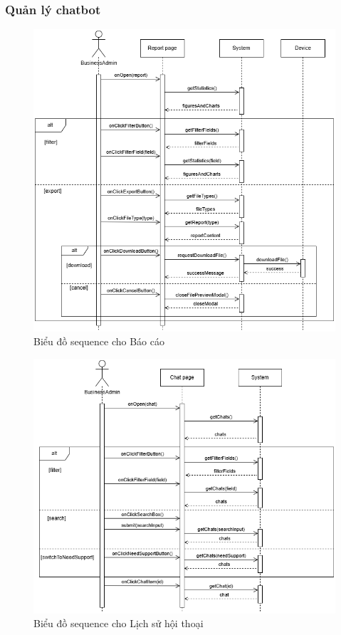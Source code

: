 \subsubsection{Quản lý chatbot}
\begin{figure}[H]
    \centering
     \includegraphics[width=1\textwidth]{Dg_Sequence/Report.png}
    \vspace{0.5cm}
    \caption{Biểu đồ sequence cho Báo cáo}
    \label{fig:enter-label}
\end{figure}
\begin{figure}[H]
    \centering
     \includegraphics[width=1\textwidth]{Dg_Sequence/Chat.png}
    \vspace{0.5cm}
    \caption{Biểu đồ sequence cho Lịch sử hội thoại}
    \label{fig:enter-label}
\end{figure}

